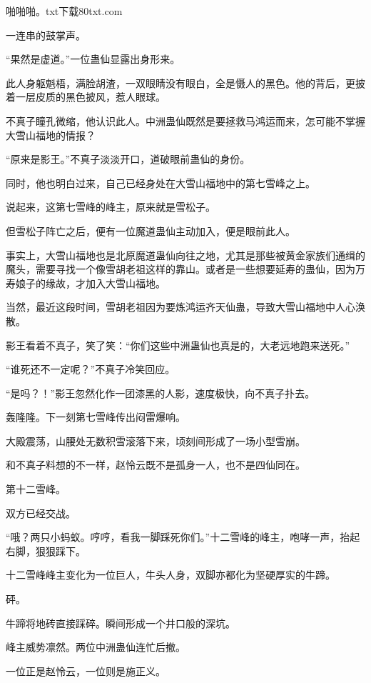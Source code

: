 
\begin{this_body}

啪啪啪。txt下载80txt.com

一连串的鼓掌声。

“果然是虚道。”一位蛊仙显露出身形来。

此人身躯魁梧，满脸胡渣，一双眼睛没有眼白，全是慑人的黑色。他的背后，更披着一层皮质的黑色披风，惹人眼球。

不真子瞳孔微缩，他认识此人。中洲蛊仙既然是要拯救马鸿运而来，怎可能不掌握大雪山福地的情报？

“原来是影王。”不真子淡淡开口，道破眼前蛊仙的身份。

同时，他也明白过来，自己已经身处在大雪山福地中的第七雪峰之上。

说起来，这第七雪峰的峰主，原来就是雪松子。

但雪松子阵亡之后，便有一位魔道蛊仙主动加入，便是眼前此人。

事实上，大雪山福地也是北原魔道蛊仙向往之地，尤其是那些被黄金家族们通缉的魔头，需要寻找一个像雪胡老祖这样的靠山。或者是一些想要延寿的蛊仙，因为万寿娘子的缘故，才加入大雪山福地。

当然，最近这段时间，雪胡老祖因为要炼鸿运齐天仙蛊，导致大雪山福地中人心涣散。

影王看着不真子，笑了笑：“你们这些中洲蛊仙也真是的，大老远地跑来送死。”

“谁死还不一定呢？”不真子冷笑回应。

“是吗？！”影王忽然化作一团漆黑的人影，速度极快，向不真子扑去。

轰隆隆。下一刻第七雪峰传出闷雷爆响。

大殿震荡，山腰处无数积雪滚落下来，顷刻间形成了一场小型雪崩。

和不真子料想的不一样，赵怜云既不是孤身一人，也不是四仙同在。

第十二雪峰。

双方已经交战。

“哦？两只小蚂蚁。哼哼，看我一脚踩死你们。”十二雪峰的峰主，咆哮一声，抬起右脚，狠狠踩下。

十二雪峰峰主变化为一位巨人，牛头人身，双脚亦都化为坚硬厚实的牛蹄。

砰。

牛蹄将地砖直接踩碎。瞬间形成一个井口般的深坑。

峰主威势凛然。两位中洲蛊仙连忙后撤。

一位正是赵怜云，一位则是施正义。


\end{this_body}
